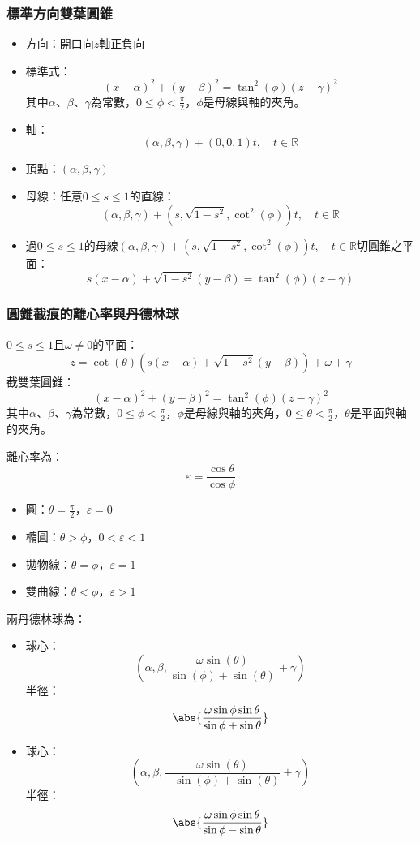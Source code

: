 \documentclass[a4paper,12pt]{article}
\begin{document}
\subsubsection{標準方向雙葉圓錐}
\begin{itemize}
\item 方向：開口向$z$軸正負向
\item 標準式：
\[(x-\alpha)^2+(y-\beta)^2=\tan^2(\phi)(z-\gamma)^2\]
其中$\alpha$、$\beta$、$\gamma$為常數，$0\leq\phi<\frac{\pi}{2}$，$\phi$是母線與軸的夾角。
\item 軸：
\[(\alpha,\beta,\gamma)+(0,0,1)t,\quad t\in\mathbb{R}\]
\item 頂點：$(\alpha,\beta,\gamma)$
\item 母線：任意$0\leq s\leq 1$的直線：
\[(\alpha,\beta,\gamma)+\left(s,\sqrt{1-s^2},\cot^2(\phi)\right)t,\quad t\in\mathbb{R}\]
\item 過$0\leq s\leq 1$的母線$(\alpha,\beta,\gamma)+\left(s,\sqrt{1-s^2},\cot^2(\phi)\right)t,\quad t\in\mathbb{R}$切圓錐之平面：
\[s(x-\alpha)+\sqrt{1-s^2}(y-\beta)=\tan^2(\phi)(z-\gamma)\]
\end{itemize}
\subsubsection{圓錐截痕的離心率與丹德林球}
$0\leq s\leq 1$且$\omega\neq 0$的平面：
\[z=\cot(\theta)\left(s(x-\alpha)+\sqrt{1-s^2}(y-\beta)\right)+\omega+\gamma\]
截雙葉圓錐：
\[(x-\alpha)^2+(y-\beta)^2=\tan^2(\phi)(z-\gamma)^2\]
其中$\alpha$、$\beta$、$\gamma$為常數，$0\leq\phi<\frac{\pi}{2}$，$\phi$是母線與軸的夾角，$0\leq\theta<\frac{\pi}{2}$，$\theta$是平面與軸的夾角。

離心率為：
\[\varepsilon=\frac{\cos\theta}{\cos\phi}\]
\begin{itemize}
\item 圓：$\theta=\frac{\pi}{2}$，$\varepsilon=0$
\item 橢圓：$\theta>\phi$，$0<\varepsilon<1$
\item 拋物線：$\theta=\phi$，$\varepsilon=1$
\item 雙曲線：$\theta<\phi$，$\varepsilon>1$
\end{itemize}

兩丹德林球為：
\begin{itemize}
\item 球心：
\[\left(\alpha,\beta,\frac{\omega\sin(\theta)}{\sin(\phi)+\sin(\theta)}+\gamma\right)\]
半徑：
\[\abs{\frac{\omega\sin\phi\sin\theta}{\sin\phi+\sin\theta}}\]
\item 球心：
\[\left(\alpha,\beta,\frac{\omega\sin(\theta)}{-\sin(\phi)+\sin(\theta)}+\gamma\right)\]
半徑：
\[\abs{\frac{\omega\sin\phi\sin\theta}{\sin\phi-\sin\theta}}\]
\end{itemize}
\end{document}
